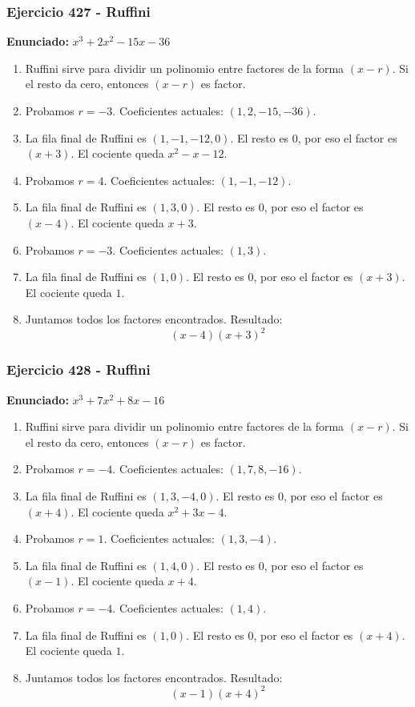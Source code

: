 \documentclass[11pt,a4paper]{article}
\begin{document}
\vspace{0.2cm}
\subsubsection*{Ejercicio 427 - Ruffini}
\textbf{Enunciado:} $ x^{3} + 2 x^{2} - 15 x - 36 $\par
\begin{enumerate}[leftmargin=2em]
\item Ruffini sirve para dividir un polinomio entre factores de la forma \((x-r)\). Si el resto da cero, entonces \((x-r)\) es factor.
\item Probamos \(r=-3\). Coeficientes actuales: \((1, 2, -15, -36)\).
\item La fila final de Ruffini es \((1, -1, -12, 0)\). El resto es \(0\), por eso el factor es \((x+3)\). El cociente queda \(x^{2} - x - 12\).
\item Probamos \(r=4\). Coeficientes actuales: \((1, -1, -12)\).
\item La fila final de Ruffini es \((1, 3, 0)\). El resto es \(0\), por eso el factor es \((x-4)\). El cociente queda \(x + 3\).
\item Probamos \(r=-3\). Coeficientes actuales: \((1, 3)\).
\item La fila final de Ruffini es \((1, 0)\). El resto es \(0\), por eso el factor es \((x+3)\). El cociente queda \(1\).
\item Juntamos todos los factores encontrados. Resultado: \[\boxed{\left(x - 4\right) \left(x + 3\right)^{2}}\]
\end{enumerate}

\vspace{0.2cm}
\subsubsection*{Ejercicio 428 - Ruffini}
\textbf{Enunciado:} $ x^{3} + 7 x^{2} + 8 x - 16 $\par
\begin{enumerate}[leftmargin=2em]
\item Ruffini sirve para dividir un polinomio entre factores de la forma \((x-r)\). Si el resto da cero, entonces \((x-r)\) es factor.
\item Probamos \(r=-4\). Coeficientes actuales: \((1, 7, 8, -16)\).
\item La fila final de Ruffini es \((1, 3, -4, 0)\). El resto es \(0\), por eso el factor es \((x+4)\). El cociente queda \(x^{2} + 3 x - 4\).
\item Probamos \(r=1\). Coeficientes actuales: \((1, 3, -4)\).
\item La fila final de Ruffini es \((1, 4, 0)\). El resto es \(0\), por eso el factor es \((x-1)\). El cociente queda \(x + 4\).
\item Probamos \(r=-4\). Coeficientes actuales: \((1, 4)\).
\item La fila final de Ruffini es \((1, 0)\). El resto es \(0\), por eso el factor es \((x+4)\). El cociente queda \(1\).
\item Juntamos todos los factores encontrados. Resultado: \[\boxed{\left(x - 1\right) \left(x + 4\right)^{2}}\]
\end{enumerate}
\end{document}
